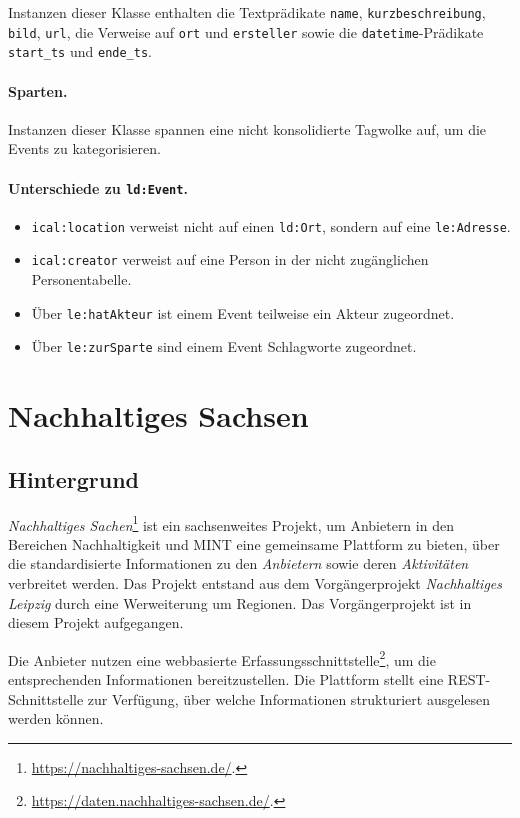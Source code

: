 \documentclass[a4paper,11pt]{article}
\begin{document}
Instanzen dieser Klasse enthalten die Textprädikate \texttt{name},
\texttt{kurzbeschreibung}, \texttt{bild}, \texttt{url}, die Verweise auf
\texttt{ort} und \texttt{ersteller} sowie die \texttt{datetime}-Prädikate
\texttt{start\_ts} und \texttt{ende\_ts}. 

\paragraph{Sparten.}
Instanzen dieser Klasse spannen eine nicht konsolidierte Tagwolke auf, um die
Events zu kategorisieren.

\paragraph{Unterschiede zu \texttt{ld:Event}.}
\begin{itemize}
\item \texttt{ical:location} verweist nicht auf einen \texttt{ld:Ort}, sondern
  auf eine \texttt{le:Adresse}.
\item \texttt{ical:creator} verweist auf eine Person in der nicht zugänglichen
  Personentabelle.
\item Über \texttt{le:hatAkteur} ist einem Event teilweise ein Akteur
  zugeordnet.
\item Über \texttt{le:zurSparte} sind einem Event Schlagworte zugeordnet.
\end{itemize}
\newpage

\section{Nachhaltiges Sachsen}

\subsection{Hintergrund}

\emph{Nachhaltiges Sachen}\footnote{\url{https://nachhaltiges-sachsen.de/}.}
ist ein sachsenweites Projekt, um Anbietern in den Bereichen Nachhaltigkeit
und MINT eine gemeinsame Plattform zu bieten, über die standardisierte
Informationen zu den \emph{Anbietern} sowie deren \emph{Aktivitäten}
verbreitet werden.  Das Projekt entstand aus dem Vorgängerprojekt
\emph{Nachhaltiges Leipzig} durch eine Werweiterung um Regionen. Das
Vorgängerprojekt ist in diesem Projekt aufgegangen.

Die Anbieter nutzen eine webbasierte
Erfassungsschnittstelle\footnote{\url{https://daten.nachhaltiges-sachsen.de/}.},
um die entsprechenden Informationen bereitzustellen.  Die Plattform stellt
eine REST-Schnittstelle zur Verfügung, über welche Informationen strukturiert
ausgelesen werden können.
\end{document}
